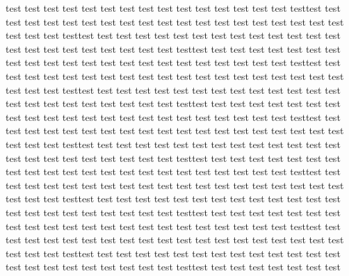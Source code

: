 test test test test test test test test test test test test test test test testtest test test test test test test test
test test test test test test test test test test test test test test test testtest test test test test test test test
test test test test test test test test test test test test test test test testtest test test test test test test test
test test test test test test test test test test test test test test test testtest test test test test test test test
test test test test test test test test test test test test test test test testtest test test test test test test test
test test test test test test test test test test test test test test test testtest test test test test test test test
test test test test test test test test test test test test test test test testtest test test test test test test test
test test test test test test test test test test test test test test test testtest test test test test test test test
test test test test test test test test test test test test test test test testtest test test test test test test test
test test test test test test test test test test test test test test test testtest test test test test test test test
test test test test test test test test test test test test test test test testtest test test test test test test test
test test test test test test test test test test test test test test test testtest test test test test test test test
test test test test test test test test test test test test test test test testtest test test test test test test test
test test test test test test test test test test test test test test test testtest test test test test test test test
test test test test test test test test test test test test test test test testtest test test test test test test test


